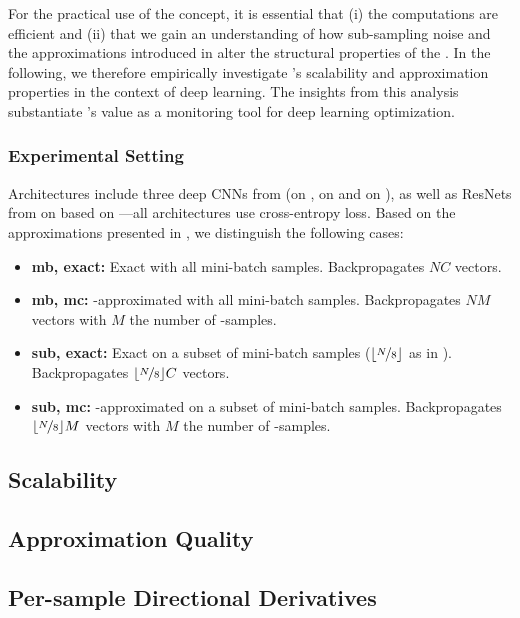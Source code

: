 For the practical use of the \vivit{} concept, it is essential that (i) the
computations are efficient and (ii) that we gain an understanding of how
sub-sampling noise and the approximations introduced in
 alter the structural properties of the \ggn{}. In the
following, we therefore empirically investigate \vivit{}'s scalability and
approximation properties in the context of deep learning. The insights from this
analysis substantiate \vivit{}'s value as a monitoring tool for deep learning
optimization.

\subsubsection{Experimental Setting}

Architectures include three deep CNNs from \deepobs \cite{schneider2019deepobs}
(\twoctwod on \fmnist{}, \threecthreed on \cifarten and \allcnnc on \cifarhun),
as well as ResNets from \citet{he2016deep} on \cifarten based on
\citet{idelbayev2018proper}---all architectures use cross-entropy loss. Based on
the approximations presented in , we distinguish
the following cases:
\begin{itemize}
\item \textbf{mb, exact:} Exact \ggn with all mini-batch samples. Backpropagates
  $NC$ vectors.
\item \textbf{mb, mc:} \mc-approximated \ggn with all mini-batch samples.
  Backpropagates $N M$ vectors with $M$ the number of \mc{}-samples.
\item \textbf{sub, exact:} Exact \ggn on a subset of mini-batch samples
  ($\lfloor \nicefrac{N}{8} \rfloor$ as in \cite{zhang2017blockdiagonal}).
  Backpropagates $\lfloor \nicefrac{N}{8} \rfloor C$ vectors.
\item \textbf{sub, mc:} \mc-approximated \ggn on a subset of mini-batch samples.
  Backpropagates $\lfloor \nicefrac{N}{8} \rfloor M$ vectors with $M$ the number of
  \mc{}-samples.
\end{itemize}

\subsection{Scalability}\label{vivit::subsec:scalability}


\subsection{Approximation Quality}\label{vivit::subsec:approx_quality}


\subsection{Per-sample Directional Derivatives}\label{vivit::subsec:directional_derivatives}


